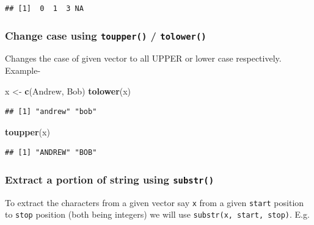 \documentclass[
]{book}
\newenvironment{Shaded}{\begin{snugshade}}{\end{snugshade}}
\newcommand{\FunctionTok}[1]{\textcolor[rgb]{0.13,0.29,0.53}{\textbf{#1}}}
\newcommand{\NormalTok}[1]{#1}
\newcommand{\OtherTok}[1]{\textcolor[rgb]{0.56,0.35,0.01}{#1}}
\newcommand{\StringTok}[1]{\textcolor[rgb]{0.31,0.60,0.02}{#1}}
\begin{document}
\begin{verbatim}
## [1]  0  1  3 NA
\end{verbatim}

\hypertarget{change-case-using-toupper-tolower}{%
\subsubsection*{\texorpdfstring{Change case using \texttt{toupper()} / \texttt{tolower()}}{Change case using toupper() / tolower()}}\label{change-case-using-toupper-tolower}}

Changes the case of given vector to all UPPER or lower case respectively.
Example-

\begin{Shaded}
\begin{Highlighting}[]
\NormalTok{x }\OtherTok{\textless{}{-}} \FunctionTok{c}\NormalTok{(}\StringTok{\textquotesingle{}Andrew\textquotesingle{}}\NormalTok{, }\StringTok{\textquotesingle{}Bob\textquotesingle{}}\NormalTok{)}
\FunctionTok{tolower}\NormalTok{(x)}
\end{Highlighting}
\end{Shaded}

\begin{verbatim}
## [1] "andrew" "bob"
\end{verbatim}

\begin{Shaded}
\begin{Highlighting}[]
\FunctionTok{toupper}\NormalTok{(x)}
\end{Highlighting}
\end{Shaded}

\begin{verbatim}
## [1] "ANDREW" "BOB"
\end{verbatim}

\hypertarget{extract-a-portion-of-string-using-substr}{%
\subsubsection*{\texorpdfstring{Extract a portion of string using \texttt{substr()}}{Extract a portion of string using substr()}}\label{extract-a-portion-of-string-using-substr}}

To extract the characters from a given vector say \texttt{x} from a given \texttt{start} position to \texttt{stop} position (both being integers) we will use \texttt{substr(x,\ start,\ stop)}. E.g.
\end{document}
